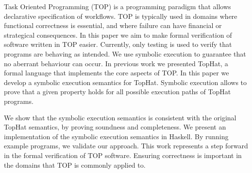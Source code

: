 
Task Oriented Programming (TOP) is a programming paradigm that allows declarative specification of workflows.
TOP is typically used in domains where functional correctness is essential, and where failure can have financial or strategical consequences.
In this paper we aim to make formal verification of software written in TOP easier.
Currently, only testing is used to verify that programs are behaving as intended.
We use symbolic execution to guarantee that no aberrant behaviour can occur.
In previous work we presented TopHat, a formal language that implements the core aspects of TOP.
In this paper we develop a symbolic execution semantics for TopHat.
Symbolic execution allows to prove that a given property holds for all possible execution paths of TopHat programs.

We show that the symbolic execution semantics is consistent with the original TopHat semantics, by proving soundness and completeness.
We present an implementation of the symbolic execution semantics in Haskell.
By running example programs, we validate our approach.
This work represents a step forward in the formal verification of TOP software.
Ensuring correctness is important in the domains that TOP is commonly applied to.


